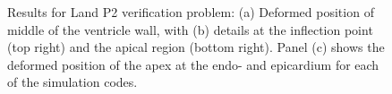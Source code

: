 \begin{figure}[ht!]
{\label{fig:land2-2}}	
%
\caption{Results for Land P2 verification problem: (a) Deformed position of middle of the ventricle wall, with (b) details at the inflection point (top right) and the apical region (bottom right). Panel (c) shows the deformed position of the apex at the endo- and epicardium for each of the simulation codes.}
\label{fig:land2}
\end{figure}


